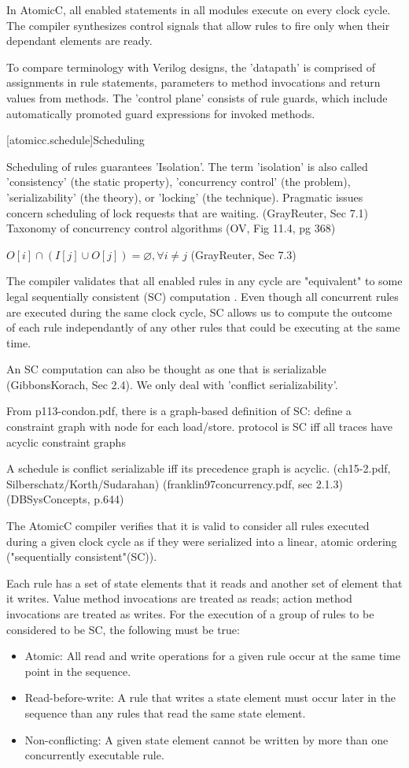 In AtomicC, all enabled statements in all modules execute on every clock cycle.
The compiler synthesizes control signals that allow rules to fire
only when their dependant elements are ready.

To compare terminology with Verilog designs, the 'datapath' is comprised of assignments in rule statements, parameters to method invocations and return values from methods.  The 'control plane' consists of rule guards, which include automatically promoted guard expressions for invoked methods.

[atomicc.schedule]{Scheduling}

Scheduling of rules guarantees 'Isolation'.
The term 'isolation' is also called 'consistency' (the static property), 'concurrency control'
(the problem), 'serializability' (the theory), or 'locking' (the technique).
Pragmatic issues concern scheduling of lock requests that are waiting.  (GrayReuter, Sec 7.1)
Taxonomy of concurrency control algorithms (OV, Fig 11.4, pg 368)

$O[i] \cap (I[j] \cup O[j]) = \varnothing, \forall i \neq j $
(GrayReuter, Sec 7.3)

The compiler validates that all enabled rules in any cycle are
"equivalent" to some legal sequentially consistent (SC)
computation \cite{Lamport:1979:MMC:1311099.1311750}.
Even though all concurrent rules are executed during the same clock cycle,
SC allows us to compute the
outcome of each rule independantly of any other rules that could be executing at the same time.

An SC computation can also be thought as one that is serializable (GibbonsKorach, Sec 2.4).
We only deal with 'conflict serializability'.

From p113-condon.pdf, there is a graph-based definition of SC: define a constraint graph with node for each load/store.  protocol is SC iff all traces have acyclic constraint graphs

A schedule is conflict serializable iff its precedence graph is acyclic. (ch15-2.pdf,
Silberschatz/Korth/Sudarahan)
(franklin97concurrency.pdf, sec 2.1.3)
(DBSysConcepts, p.644)

The AtomicC compiler verifies that it is valid to consider
all rules executed during a given clock cycle
as if they were serialized into a linear, atomic ordering ("sequentially consistent"(SC)).

Each rule has a set of state elements that it reads and another set of element that it writes.
Value method invocations are treated as reads; action method invocations are treated as writes.
For the execution of a group of rules to be considered to be SC, the following must
be true:
\begin{itemize}
\item Atomic: All read and write operations for a given rule occur at the same time point in the sequence.
\item Read-before-write:  A rule that writes a state element must occur later in the sequence
than any rules that read the same state element.
\item Non-conflicting: A given state element cannot be written by more than one concurrently executable rule.
\end{itemize}

